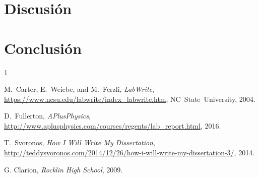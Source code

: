 \documentclass[article, 11pt]{IEEEtran}   %
\begin{document}
\section{Discusi\'on}
\lipsum[1-2]

\section{Conclusi\'on}
\lipsum[1-1]

\begin{thebibliography}{1}

M.~Carter, E.~Weiebe, and M.~Ferzli, \emph{LabWrite}, \url{https://www.ncsu.edu/labwrite/index_labwrite.htm}, NC~State~University, 2004.

D.~Fullerton, \emph{APlusPhysics}, \url{http://www.aplusphysics.com/courses/regents/lab_report.html}, 2016.

T.~Svoronos, \emph{How I Will Write My Dissertation}, \url{http://teddysvoronos.com/2014/12/26/how-i-will-write-my-dissertation-3/}, 2014.

G. Clarion, \emph{Rocklin High School}, 2009.

\end{thebibliography}
\end{document}
